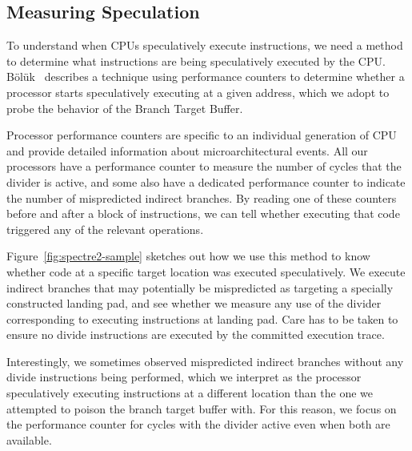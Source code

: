 \subsection{Measuring Speculation}

To understand when CPUs speculatively execute instructions, we need a
method to determine what instructions are being speculatively executed
by the CPU.  Bölük~\cite{speculating-x86} describes a technique using
performance counters to determine whether a processor starts
speculatively executing at a given address, which we adopt to probe
the behavior of the Branch Target Buffer.

Processor performance counters are specific to an individual generation of CPU and provide detailed information about microarchitectural events.
All our processors have a performance counter to measure the number of cycles that the divider is active, and some also have a dedicated performance counter to indicate the number of mispredicted indirect branches.
By reading one of these counters before and after a block of instructions, we can tell whether executing that code triggered any of the relevant operations.

Figure~\ref{fig:spectre2-sample} sketches out how we use this method to know whether code at a specific target location was executed speculatively.
We execute indirect branches that may potentially be mispredicted as targeting a specially constructed landing pad, and see whether we measure any use of the divider corresponding to executing instructions at landing pad.
Care has to be taken to ensure no divide instructions are executed by the committed execution trace.

Interestingly, we sometimes observed mispredicted indirect branches without any divide instructions being performed, which we interpret as the processor speculatively executing instructions at a different location than the one we attempted to poison the branch target buffer with.
For this reason, we focus on the performance counter for cycles with the divider active even when both are available.



